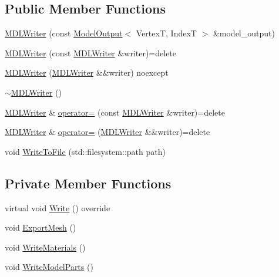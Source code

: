 \subsection*{Public Member Functions}
\begin{DoxyCompactItemize}
\item 
\mbox{\hyperlink{classmage_1_1rendering_1_1loader_1_1_m_d_l_writer_a6b30e49f08b5c6cd4702f5fdecd17561}{M\+D\+L\+Writer}} (const \mbox{\hyperlink{structmage_1_1rendering_1_1_model_output}{Model\+Output}}$<$ VertexT, IndexT $>$ \&model\+\_\+output)
\item 
\mbox{\hyperlink{classmage_1_1rendering_1_1loader_1_1_m_d_l_writer_a475ff3efdba707303052bae28d3ba85b}{M\+D\+L\+Writer}} (const \mbox{\hyperlink{classmage_1_1rendering_1_1loader_1_1_m_d_l_writer}{M\+D\+L\+Writer}} \&writer)=delete
\item 
\mbox{\hyperlink{classmage_1_1rendering_1_1loader_1_1_m_d_l_writer_a27f71b3a27f96e263948d19b8b570309}{M\+D\+L\+Writer}} (\mbox{\hyperlink{classmage_1_1rendering_1_1loader_1_1_m_d_l_writer}{M\+D\+L\+Writer}} \&\&writer) noexcept
\item 
\mbox{\hyperlink{classmage_1_1rendering_1_1loader_1_1_m_d_l_writer_aaa0fb8c60dee5352ed467bfb3f283f43}{$\sim$\+M\+D\+L\+Writer}} ()
\item 
\mbox{\hyperlink{classmage_1_1rendering_1_1loader_1_1_m_d_l_writer}{M\+D\+L\+Writer}} \& \mbox{\hyperlink{classmage_1_1rendering_1_1loader_1_1_m_d_l_writer_a9e5f38a8b5016534385039d44d3d71dc}{operator=}} (const \mbox{\hyperlink{classmage_1_1rendering_1_1loader_1_1_m_d_l_writer}{M\+D\+L\+Writer}} \&writer)=delete
\item 
\mbox{\hyperlink{classmage_1_1rendering_1_1loader_1_1_m_d_l_writer}{M\+D\+L\+Writer}} \& \mbox{\hyperlink{classmage_1_1rendering_1_1loader_1_1_m_d_l_writer_aaa2a3f4e8025bffefefaae7d3ef018f0}{operator=}} (\mbox{\hyperlink{classmage_1_1rendering_1_1loader_1_1_m_d_l_writer}{M\+D\+L\+Writer}} \&\&writer)=delete
\item 
void \mbox{\hyperlink{classmage_1_1rendering_1_1loader_1_1_m_d_l_writer_ac01e930b55888da88e345b0910d4b1c2}{Write\+To\+File}} (std\+::filesystem\+::path path)
\end{DoxyCompactItemize}
\subsection*{Private Member Functions}
\begin{DoxyCompactItemize}
\item 
virtual void \mbox{\hyperlink{classmage_1_1rendering_1_1loader_1_1_m_d_l_writer_a1506b1a09c7a7c1ee1e206cc6d5cd0e0}{Write}} () override
\item 
void \mbox{\hyperlink{classmage_1_1rendering_1_1loader_1_1_m_d_l_writer_a77189702168fc4ea6b9482a9efec788f}{Export\+Mesh}} ()
\item 
void \mbox{\hyperlink{classmage_1_1rendering_1_1loader_1_1_m_d_l_writer_afcd1eca27b5854b0f0406dbcae135499}{Write\+Materials}} ()
\item 
void \mbox{\hyperlink{classmage_1_1rendering_1_1loader_1_1_m_d_l_writer_a8fcd997a51d7a46149596d332ebdb8e1}{Write\+Model\+Parts}} ()
\end{DoxyCompactItemize}
